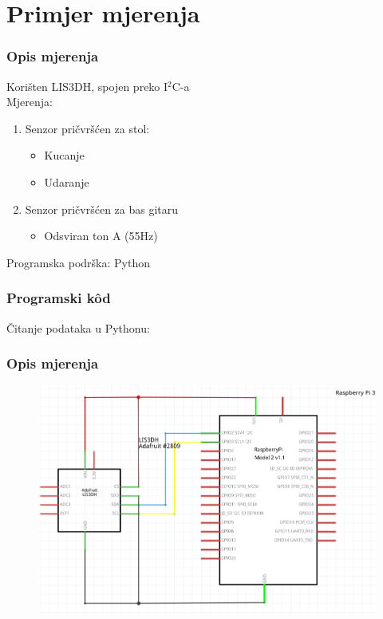 \documentclass[12pt]{beamer}
\begin{document}
\section{Primjer mjerenja}
\begin{frame}
	\frametitle{Opis mjerenja}
	Korišten LIS3DH, spojen preko I$^2$C-a \\
	Mjerenja:
	\begin{enumerate}
		\item Senzor pričvršćen za stol:
		\begin{itemize}
			\item Kucanje
			\item Udaranje
		\end{itemize}
		\item Senzor pričvršćen za bas gitaru
			\begin{itemize}
			\item Odsviran ton A (55Hz)
		\end{itemize}
	\end{enumerate}
	Programska podrška: Python
\end{frame}


\begin{frame}[fragile]
	\frametitle{Programski kôd}
	Čitanje podataka u Pythonu:
	
\end{frame}


\begin{frame}
	\frametitle{Opis mjerenja}
	\begin{figure}[h]
		\centering
		\includegraphics[width=0.8\linewidth]{slike/lisRpiI2C.png}
	\end{figure}
\end{frame}
\end{document}
